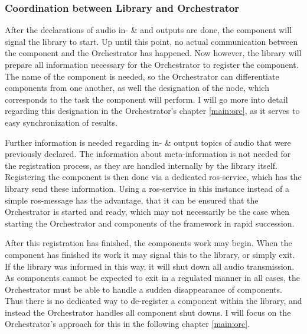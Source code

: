 \subsubsection{Coordination between Library and Orchestrator}
After the declarations of audio in- \& and outputs are done, the component will signal the library to start.
Up until this point, no actual communication between the component and the Orchestrator has happened.
Now however, the library will prepare all information necessary for the Orchestrator to register the component.
The name of the component is needed, so the Orchestrator can differentiate components from one another, as well the designation of the node, which corresponds to the task the component will perform.
I will go more into detail regarding this designation in the Orchestrator's chapter \ref{main:orc}, as it serves to easy synchronization of results.

Further information is needed regarding in- \& output topics of audio that were previously declared.
The information about meta-information is not needed for the registration process, as they are handled internally by the library itself.
Registering the component is then done via a dedicated \gls{ros}-service, which has the library send these information.
Using a \gls{ros}-service in this instance instead of a simple \gls{ros}-message has the advantage, that it can be ensured that the Orchestrator is started and ready, which may not necessarily be the case when starting the Orchestrator and components of the framework in rapid succession.

After this registration has finished, the components work may begin.
When the component has finished its work it may signal this to the library, or simply exit.
If the library was informed in this way, it will shut down all audio transmission.
As components cannot be expected to exit in a regulated manner in all cases, the Orchestrator must be able to handle a sudden disappearance of components.
Thus there is no dedicated way to de-register a component within the library, and instead the Orchestrator handles all component shut downs.
I will focus on the Orchestrator's approach for this in the following chapter \ref{main:orc}.

